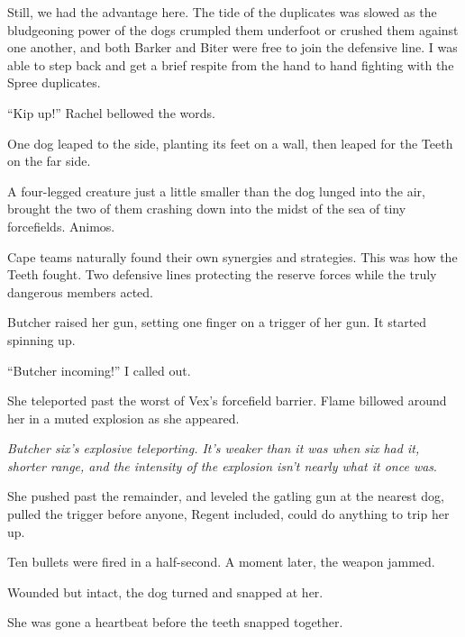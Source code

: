 Still, we had the advantage here.  The tide of the duplicates was slowed as the bludgeoning power of the dogs crumpled them underfoot or crushed them against one another, and both Barker and Biter were free to join the defensive line.  I was able to step back and get a brief respite from the hand to hand fighting with the Spree duplicates.



``Kip up!'' Rachel bellowed the words.



One dog leaped to the side, planting its feet on a wall, then leaped for the Teeth on the far side.



A four-legged creature just a little smaller than the dog lunged into the air, brought the two of them crashing down into the midst of the sea of tiny forcefields.  Animos.



Cape teams naturally found their own synergies and strategies.  This was how the Teeth fought.  Two defensive lines protecting the reserve forces while the truly dangerous members acted.



Butcher raised her gun, setting one finger on a trigger of her gun.  It started spinning up.



``Butcher incoming!'' I called out.



She teleported past the worst of Vex's forcefield barrier.  Flame billowed around her in a muted explosion as she appeared.



\emph{Butcher six's explosive teleporting.  It's weaker than it was when }\emph{six had it, shorter range, and the intensity of the explosion isn't nearly what it once was}.



She pushed past the remainder, and leveled the gatling gun at the nearest dog, pulled the trigger before anyone, Regent included, could do anything to trip her up.



Ten bullets were fired in a half-second.  A moment later, the weapon jammed.



Wounded but intact, the dog turned and snapped at her.



She was gone a heartbeat before the teeth snapped together.



